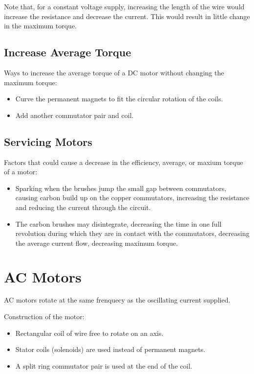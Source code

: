 \documentclass[a4paper,11pt]{report}
\begin{document}
Note that, for a constant voltage supply, increasing the length of the wire
would increase the resistance and decrease the current. This would result in
little change in the maximum torque.

\subsection{Increase Average Torque}

Ways to increase the average torque of a DC motor without changing the maximum
torque:

\begin{itemize}
\item Curve the permanent magnets to fit the circular rotation of the coils.
\item Add another commutator pair and coil.
\end{itemize}

\subsection{Servicing Motors}

Factors that could cause a decrease in the efficiency, average, or maxium
torque of a motor:

\begin{itemize}
\item Sparking when the brushes jump the small gap between commutators,
	causing carbon build up on the copper commutators, increasing the
	resistance and reducing the current through the circuit.
\item The carbon brushes may disintegrate, decreasing the time in one full
	revolution during which they are in contact with the commutators,
	decreasing the average current flow, decreasing maximum torque.
\end{itemize}


\section{AC Motors}

AC motors rotate at the same frenquecy as the oscillating current supplied.

Construction of the motor:

\begin{itemize}
\item Rectangular coil of wire free to rotate on an axis.
\item Stator coils (solenoids) are used instead of permanent magnets.
\item A split ring commutator pair is used at the end of the coil.
\end{itemize}
\end{document}
